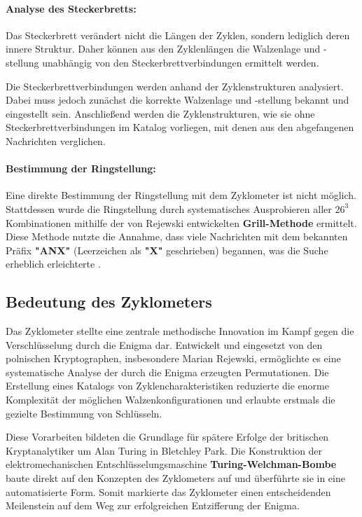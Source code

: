 \documentclass[12pt, ngerman, a4paper, numbers=noenddot]{article}
\begin{document}
\paragraph{Analyse des Steckerbretts:}

Das Steckerbrett verändert nicht die Längen der Zyklen, sondern lediglich deren innere Struktur. Daher können aus den Zyklenlängen die Walzenlage und -stellung unabhängig von den Steckerbrettverbindungen ermittelt werden.

Die Steckerbrettverbindungen werden anhand der Zyklenstrukturen analysiert. Dabei muss jedoch zunächst die korrekte Walzenlage und -stellung bekannt und eingestellt sein. Anschließend werden die Zyklenstrukturen, wie sie ohne Steckerbrettverbindungen im Katalog vorliegen, mit denen aus den abgefangenen Nachrichten verglichen.

\paragraph{Bestimmung der Ringstellung:}

Eine direkte Bestimmung der Ringstellung mit dem Zyklometer ist nicht möglich. Stattdessen wurde die Ringstellung durch systematisches Ausprobieren aller $26^3$ Kombinationen mithilfe der von Rejewski entwickelten \textbf{Grill-Methode} ermittelt. Diese Methode nutzte die Annahme, dass viele Nachrichten mit dem bekannten Präfix \textbf{"ANX"} (Leerzeichen als  \textbf{"X"} geschrieben) begannen, was die Suche erheblich erleichterte \autocite{rejewski1981enigma}.



\subsection{Bedeutung des Zyklometers}

Das Zyklometer stellte eine zentrale methodische Innovation im Kampf gegen die Verschlüsselung durch die Enigma dar. Entwickelt und eingesetzt von den polnischen Kryptographen, insbesondere Marian Rejewski, ermöglichte es eine systematische Analyse der durch die Enigma erzeugten Permutationen. Die Erstellung eines Katalogs von Zyklencharakteristiken reduzierte die enorme Komplexität der möglichen Walzenkonfigurationen und erlaubte erstmals die gezielte Bestimmung von Schlüsseln.

Diese Vorarbeiten bildeten die Grundlage für spätere Erfolge der britischen Kryptanalytiker um Alan Turing in Bletchley Park. Die Konstruktion der elektromechanischen Entschlüsselungsmaschine \textbf{Turing-Welchman-Bombe} baute direkt auf den Konzepten des Zyklometers auf und überführte sie in eine automatisierte Form. Somit markierte das Zyklometer einen entscheidenden Meilenstein auf dem Weg zur erfolgreichen Entzifferung der Enigma.
\end{document}
